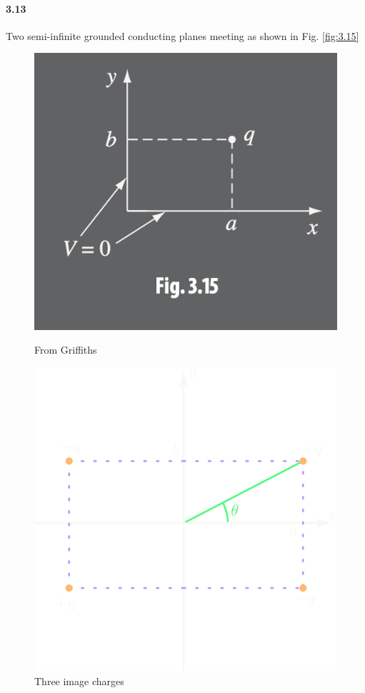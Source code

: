 \documentclass[../main.tex]{subfiles}
\begin{document}
\paragraph{3.13} Two semi-infinite grounded conducting planes meeting as shown in Fig. \ref{fig:3.15}
\begin{figure}[ht]
    \centering
    \begin{minipage}{0.45\linewidth}
        \centering
        \includegraphics[width=\linewidth]{hw3_15.png}
        \caption{From Griffiths}
        \label{fig:3.15}
    \end{minipage} \hfill
    \begin{minipage}{0.45\linewidth}
        \centering
        \includegraphics[width=\linewidth]{fig3_15b.png}
        \caption{Three image charges}
        \label{fig:3.15b}
    \end{minipage}
\end{figure}
\end{document}
